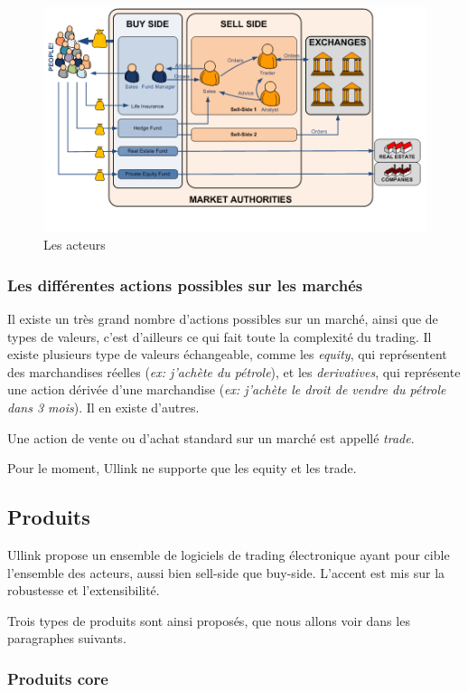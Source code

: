 \documentclass[a4paper, 12pt]{article}
\begin{document}
\begin{figure}
\includegraphics[width=\textwidth]{market_actors.png}
\caption{Les acteurs}
\label{market_actors}
\end{figure}

\subsubsection{Les différentes actions possibles sur les marchés}

Il existe un très grand nombre d'actions possibles sur un marché, ainsi que de types de valeurs, c'est d'ailleurs ce qui fait toute la complexité du trading. Il existe plusieurs type de valeurs échangeable, comme les \emph{equity}, qui représentent des marchandises réelles (\emph{ex: j'achète du pétrole}), et les \emph{derivatives}, qui représente une action dérivée d'une marchandise (\emph{ex: j'achète le droit de vendre du pétrole dans 3 mois}). Il en existe d'autres.

Une action de vente ou d'achat standard sur un marché est appellé \emph{trade}.

Pour le moment, Ullink ne supporte que les equity et les trade.

\subsection{Produits}

Ullink propose un ensemble de logiciels de trading électronique ayant pour cible l'ensemble des acteurs, aussi bien sell-side que buy-side. L'accent est mis sur la robustesse et l'extensibilité.

Trois types de produits sont ainsi proposés, que nous allons voir dans les paragraphes suivants.

\subsubsection{Produits core}
\end{document}
